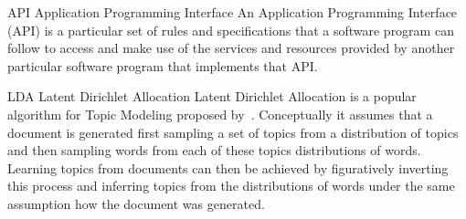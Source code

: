 




  {API}            %
  {Application Programming Interface}  %
  {An Application Programming Interface (API) is a particular set of rules and specifications that a software program can follow to access and make use of the services and resources provided by another particular software program that implements that API.} %















  {LDA}
  {Latent Dirichlet Allocation}
  {Latent Dirichlet Allocation is a popular algorithm for \gls{Topic Modeling} proposed by~\cite{Blei:2003aa}. Conceptually it assumes that a document is generated first sampling a set of topics from a distribution of topics and then sampling words from each of these topics distributions of words. Learning topics from documents can then be achieved by figuratively inverting this process and inferring topics from the distributions of words under the same assumption how the document was generated.}


